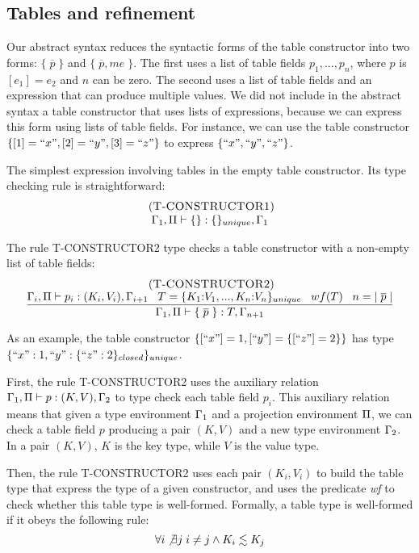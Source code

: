 \subsection{Tables and refinement}
\label{sec:refinement}

Our abstract syntax reduces the syntactic forms of the table constructor
into two forms: $\{\;\overline{p}\;\}$ and $\{\;\overline{p},me\;\}$.
The first uses a list of table fields $p_{1}, ..., p_{n}$,
where $p$ is $[e_{1}] = e_{2}$ and $n$ can be zero.
The second uses a list of table fields and an expression that can
produce multiple values.
We did not include in the abstract syntax a table constructor that uses
lists of expressions, because we can express this form using lists of
table fields.
For instance, we can use the table constructor
$\{ [1] = ``x", [2] = ``y", [3] = ``z" \}$ to express $\{ ``x", ``y", ``z" \}$.

The simplest expression involving tables in the empty table constructor.
Its type checking rule is straightforward:
\[
\begin{array}{c}
\; (\textsc{T-CONSTRUCTOR1})\\
\Gamma_{1}, \Pi \vdash \{\}:\{\}_{unique}, \Gamma_{1}
\end{array}
\]

The rule \textsc{T-CONSTRUCTOR2} type checks a table constructor with a non-empty
list of table fields:
\[
\begin{array}{c}
\; (\textsc{T-CONSTRUCTOR2})\\
\dfrac{\Gamma_{i}, \Pi \vdash p_{i}:(K_{i},V_{i}), \Gamma_{i+1} \;\;\;
       T = \{K_{1}{:}V_{1}, ..., K_{n}{:}V_{n}\}_{unique} \;\;\;
       wf(T) \;\;\;
       n = |\;\overline{p}\;|}
      {\Gamma_{1}, \Pi \vdash \{\;\overline{p}\;\}:T, \Gamma_{n+1}}
\end{array}
\]

As an example, the table constructor $\{[``x"] = 1, [``y"] = \{[``z"] = 2\}\}$
has type $\{``x":1, ``y":\{``z":2\}_{closed}\}_{unique}$.

First, the rule \textsc{T-CONSTRUCTOR2} uses the auxiliary relation
$\Gamma_{1}, \Pi \vdash p : (K,V), \Gamma_{2}$ to type check each table
field $p_{i}$.
This auxiliary relation means that given a type environment $\Gamma_{1}$
and a projection environment $\Pi$, we can check a table field $p$
producing a pair $(K,V)$ and a new type environment $\Gamma_{2}$. 
In a pair $(K,V)$, $K$ is the key type, while $V$ is the value type.

Then, the rule \textsc{T-CONSTRUCTOR2} uses each pair $(K_{i},V_{i})$
to build the table type that express the type of a given constructor, and
uses the predicate \emph{wf} to check whether this table type is well-formed.
Formally, a table type is well-formed if it obeys the following rule:
\[
\forall i \not\exists j \; i \not= j \wedge K_{i} \lesssim K_{j}
\]

